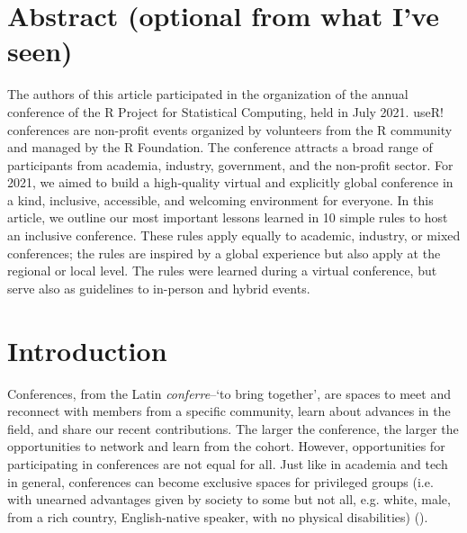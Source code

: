 \documentclass[10pt,letterpaper]{article}
\begin{document}
\section*{Abstract (optional from what I've seen)}

The authors of this article participated in the organization of the annual conference of the R Project for Statistical Computing, held in July 2021. useR! conferences are non-profit events organized by volunteers from the R community and managed by the R Foundation. The conference attracts a broad range of participants from academia, industry, government, and the non-profit sector. For 2021, we aimed to build a high-quality virtual and explicitly global conference in a kind, inclusive, accessible, and welcoming environment for everyone. 
In this article, we outline our most important lessons learned in 10 simple rules to host an inclusive conference. These rules apply equally to academic, industry, or mixed conferences; the rules are inspired by a global experience but also apply at the regional or local level. The rules were learned during a virtual conference, but serve also as guidelines to in-person and hybrid events. 


\linenumbers

\section*{Introduction}

Conferences, from the Latin \textit{conferre}--`to bring together', are spaces to meet and reconnect with members from a specific community, learn about advances in the field, and share our recent contributions.
The larger the conference, the larger the opportunities to network and learn from the cohort.
However, opportunities for participating in conferences are not equal for all. 
Just like in academia and tech in general, conferences can become exclusive spaces for privileged groups (i.e. with unearned advantages given by society to some but not all, e.g. white, male, from a rich country, English-native speaker, with no physical disabilities) (\cite{arendDisparityConferenceRegistration2019, biggsAcademicConferenceChilly2018, depickerRethinkingInclusionDisability2020a, irishIncreasingParticipationUsing2020}).
\end{document}
